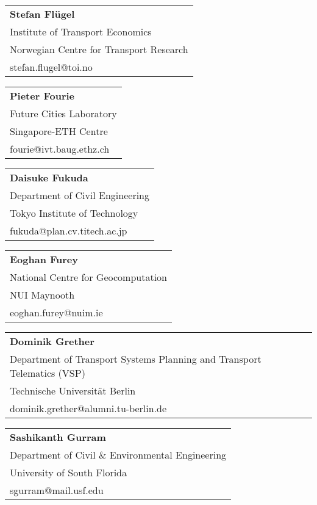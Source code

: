 \begin{tabular}[width=0.48\textwidth]{@{}l}
\textbf{Stefan Flügel} \\
Institute of Transport Economics \\
Norwegian Centre for Transport Research \\
stefan.flugel@toi.no \\
\end{tabular}

\begin{tabular}[width=0.48\textwidth]{@{}l}
\textbf{Pieter Fourie} \\
Future Cities Laboratory \\
Singapore-ETH Centre\\
fourie@ivt.baug.ethz.ch \\
\end{tabular}

\begin{tabular}[width=0.48\textwidth]{@{}l}
\textbf{Daisuke Fukuda} \\
Department of Civil Engineering\\
Tokyo Institute of Technology\\
fukuda@plan.cv.titech.ac.jp\\
\end{tabular}

\begin{tabular}[width=0.48\textwidth]{@{}l}
\textbf{Eoghan Furey} \\
National Centre for Geocomputation \\
NUI Maynooth \\
eoghan.furey@nuim.ie \\
\end{tabular}

\begin{tabular}[width=0.48\textwidth]{@{}l}
\textbf{Dominik Grether} \\
Department of Transport Systems Planning and Transport Telematics (VSP) \\
Technische Universität Berlin \\
dominik.grether@alumni.tu-berlin.de\\
\end{tabular}

\begin{tabular}[width=0.48\textwidth]{@{}l}
\textbf{Sashikanth Gurram} \\
Department of Civil \& Environmental Engineering \\
University of South Florida \\
sgurram@mail.usf.edu \\
\end{tabular}

